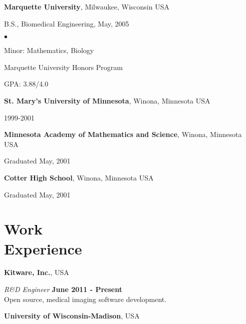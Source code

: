 \documentclass[margin,line]{res}
\newenvironment{list1}{
  \begin{list}{\ding{113}}{%
      \setlength{\itemsep}{0in}
      \setlength{\parsep}{0in} \setlength{\parskip}{0in}
      \setlength{\topsep}{0in} \setlength{\partopsep}{0in} 
      \setlength{\leftmargin}{0.17in}}}{\end{list}}
\newenvironment{list2}{
  \begin{list}{$\bullet$}{%
      \setlength{\itemsep}{0in}
      \setlength{\parsep}{0in} \setlength{\parskip}{0in}
      \setlength{\topsep}{0in} \setlength{\partopsep}{0in} 
      \setlength{\leftmargin}{0.2in}}}{\end{list}}
\begin{document}
\begin{resume}
{\bf Marquette University}, Milwaukee, Wisconsin USA\\
\vspace*{-.1in}
\begin{list1}
\item[] B.S., Biomedical Engineering,  May, 2005

\begin{list2}
 \vspace*{.05in}
 \item Minor: Mathematics, Biology
 \item Marquette University Honors Program
 \item GPA: 3.88/4.0
\end{list2}
\end{list1}

{\bf St. Mary's University of Minnesota}, Winona, Minnesota USA\\
\vspace*{-.1in}
\begin{list1}
\item[] 1999-2001
\end{list1}


{\bf Minnesota Academy of Mathematics and Science}, Winona, Minnesota USA\\
\vspace*{-.1in}
\begin{list1}
\item[] Graduated May, 2001
\end{list1}

{\bf Cotter High School}, Winona, Minnesota USA\\
\vspace*{-.1in}
\begin{list1}
\item[] Graduated May, 2001
\end{list1}

\section{\sc Work\\ Experience}

{\bf Kitware, Inc.}, USA

\vspace{-.3cm}
{\em R\&D Engineer} \hfill {\bf June 2011 - Present} \\
Open source, medical imaging software development.

{\bf University of Wisconsin-Madison}, USA


\end{resume}
\end{document}
